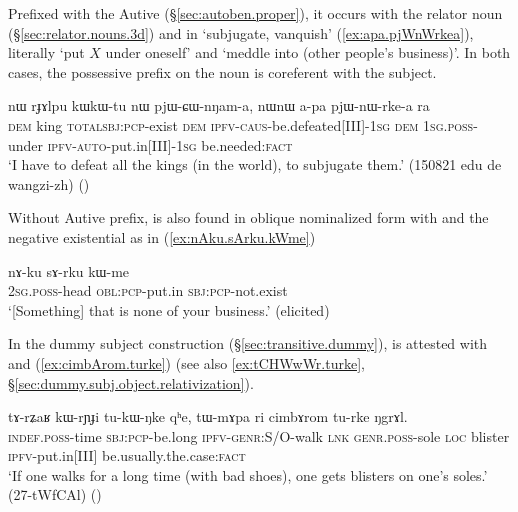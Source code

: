 Prefixed with the Autive  (§\ref{sec:autoben.proper}), it occurs with the relator noun  (§\ref{sec:relator.nouns.3d}) and  in  `subjugate, vanquish' (\ref{ex:apa.pjWnWrkea}), literally `put $X$ under oneself' and  `meddle into (other people's business)'. In both cases, the possessive prefix on the noun is coreferent with the subject.

\begin{exe}
\ex \label{ex:apa.pjWnWrkea}
\gll nɯ rɟɤlpu kɯ\redp{}kɯ-tu nɯ pjɯ-ɕɯ-nŋam-a, nɯnɯ a-pa pjɯ-nɯ-rke-a ra \\
\textsc{dem} king \textsc{total}\redp{}\textsc{sbj}:\textsc{pcp}-exist \textsc{dem} \textsc{ipfv}-\textsc{caus}-be.defeated[III]-\textsc{1sg} \textsc{dem} \textsc{1sg}.\textsc{poss}-under \textsc{ipfv}-\textsc{auto}-put.in[III]-\textsc{1sg} be.needed:\textsc{fact} \\
\glt `I have to defeat all the kings (in the world), to subjugate them.' (150821 edu de wangzi-zh)
()
\end{exe}


Without Autive prefix,  is also found in oblique nominalized form with  and the negative existential  as in (\ref{ex:nAku.sArku.kWme})

\begin{exe}
\ex \label{ex:nAku.sArku.kWme}
\gll nɤ-ku sɤ-rku kɯ-me \\
\textsc{2sg}.\textsc{poss}-head \textsc{obl}:\textsc{pcp}-put.in \textsc{sbj}:\textsc{pcp}-not.exist  \\
\glt `[Something] that is none of your business.' (elicited)
\end{exe}

In the dummy subject construction (§\ref{sec:transitive.dummy}),  is attested with  and  (\ref{ex:cimbArom.turke}) (see also \ref{ex:tCHWwWr.turke}, §\ref{sec:dummy.subj.object.relativization}).

\begin{exe}
\ex \label{ex:cimbArom.turke}
\gll tɤ-rʑaʁ kɯ-rɲɟi tu-kɯ-ŋke qʰe, tɯ-mɤpa ri cimbɤrom tu-rke ŋgrɤl. \\
\textsc{indef}.\textsc{poss}-time \textsc{sbj}:\textsc{pcp}-be.long \textsc{ipfv}-\textsc{genr}:S/O-walk \textsc{lnk} \textsc{genr}.\textsc{poss}-sole \textsc{loc} blister \textsc{ipfv}-put.in[III] be.usually.the.case:\textsc{fact} \\
\glt `If one walks for a long time (with bad shoes), one gets blisters on one's soles.' (27-tWfCAl)
()
\end{exe}
 
